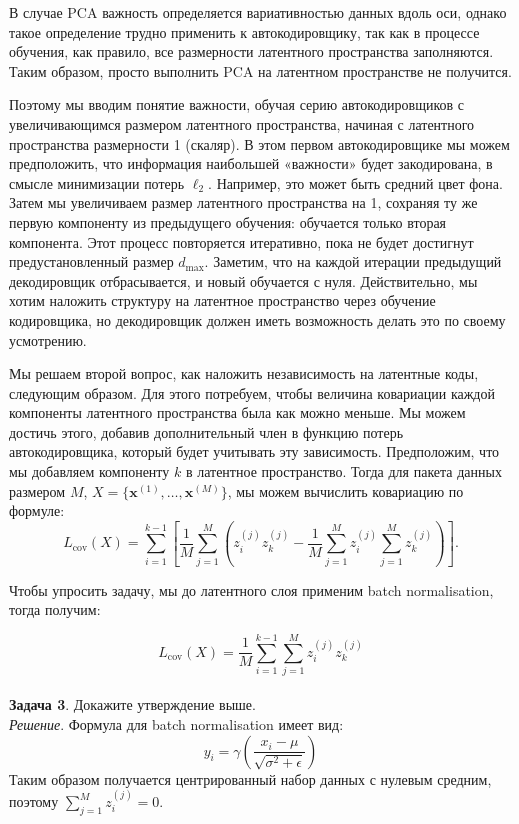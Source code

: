 В случае PCA важность определяется вариативностью данных вдоль оси, однако такое определение трудно применить к автокодировщику, так как в процессе обучения, как правило, все размерности латентного пространства заполняются. Таким образом, просто выполнить PCA на латентном пространстве не получится.

Поэтому мы вводим понятие важности, обучая серию автокодировщиков с увеличивающимся размером латентного пространства, начиная с латентного пространства размерности 1 (скаляр). В этом первом автокодировщике мы можем предположить, что информация наибольшей «важности» будет закодирована, в смысле минимизации потерь \( \ell_2 \). Например, это может быть средний цвет фона. Затем мы увеличиваем размер латентного пространства на 1, сохраняя ту же первую компоненту из предыдущего обучения: обучается только вторая компонента. Этот процесс повторяется итеративно, пока не будет достигнут предустановленный размер \( d_{\max} \). Заметим, что на каждой итерации предыдущий декодировщик отбрасывается, и новый обучается с нуля. Действительно, мы хотим наложить структуру на латентное пространство через обучение кодировщика, но декодировщик должен иметь возможность делать это по своему усмотрению.

Мы решаем второй вопрос, как наложить независимость на латентные коды, следующим образом. Для этого потребуем, чтобы величина ковариации каждой компоненты латентного пространства была как можно меньше. Мы можем достичь этого, добавив дополнительный член в функцию потерь автокодировщика, который будет учитывать эту зависимость. Предположим, что мы добавляем компоненту \( k \) в латентное пространство. Тогда для пакета данных размером \( M \), \( X = \{ \mathbf{x}^{(1)}, \dots, \mathbf{x}^{(M)} \} \), мы можем вычислить ковариацию по формуле:
\[
L_{\text{cov}}(X) = \sum_{i=1}^{k-1} \left[ \frac{1}{M} \sum_{j=1}^{M} \left( z_i^{(j)} z_k^{(j)} - \frac{1}{M} \sum_{j=1}^{M} z_i^{(j)} \sum_{j=1}^{M} z_k^{(j)} \right) \right].
\]

Чтобы упросить задачу, мы до латентного слоя применим batch normalisation, тогда получим: 

$$L_{\text{cov}}(X) = \frac{1}{M} \sum_{i=1}^{k-1} \sum_{j=1}^{M} z_i^{(j)} z_k^{(j)}
$$\\

\textbf{Задача 3}. Докажите утверждение выше.\\

\textit{Решение}.
Формула для batch normalisation имеет вид:
\[
y_i = \gamma \left( \frac{x_i - \mu}{\sqrt{\sigma^2 + \epsilon}} \right)
\]
Таким образом получается центрированный набор данных с нулевым средним, поэтому  $\sum_{j=1}^{M} z_i^{(j)} = 0$.\\


